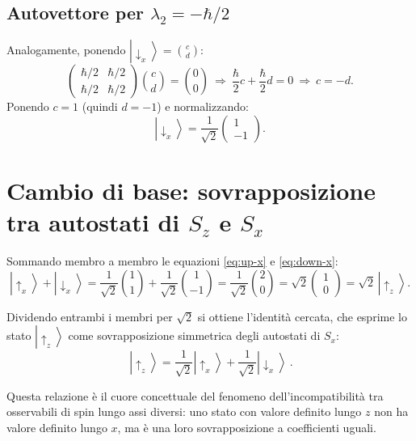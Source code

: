 \documentclass[11pt,a4paper]{article}
\newcommand{\ket}[1]{\left|#1\right\rangle}
\begin{document}
\subsection{Autovettore per \texorpdfstring{$\lambda_2=-\hbar/2$}{lambda2=-h/2}}

Analogamente, ponendo $\ket{\downarrow_x}=\binom{c}{d}$:
\[
\begin{pmatrix}\hbar/2 & \hbar/2\\ \hbar/2 & \hbar/2\end{pmatrix}\binom{c}{d}=\binom{0}{0}
\ \Longrightarrow\ \frac{\hbar}{2}c+\frac{\hbar}{2}d=0 \ \Longrightarrow\ c=-d.
\]
Ponendo $c=1$ (quindi $d=-1$) e normalizzando:
\begin{equation}
\ket{\downarrow_x} = \frac{1}{\sqrt2}\begin{pmatrix}1\\-1\end{pmatrix}.
\label{eq:down-x}
\end{equation}

\section{Cambio di base: sovrapposizione tra autostati di \texorpdfstring{$S_z$}{Sz} e \texorpdfstring{$S_x$}{Sx}}

Sommando membro a membro le equazioni \eqref{eq:up-x} e \eqref{eq:down-x}:
\begin{equation}
\ket{\uparrow_x}+\ket{\downarrow_x}
= \frac{1}{\sqrt2}\binom{1}{1}+\frac{1}{\sqrt2}\binom{1}{-1}
= \frac{1}{\sqrt2}\binom{2}{0}
= \sqrt2\begin{pmatrix}1\\0\end{pmatrix}
= \sqrt2\,\ket{\uparrow_z}.
\label{eq:somma-autostati}
\end{equation}

Dividendo entrambi i membri per $\sqrt2$ si ottiene l'identità cercata, che esprime lo stato $\ket{\uparrow_z}$ come sovrapposizione simmetrica degli autostati di $S_x$:
\begin{equation}
\boxed{\ \ket{\uparrow_z} = \frac{1}{\sqrt2}\ket{\uparrow_x}+\frac{1}{\sqrt2}\ket{\downarrow_x}\ }.
\label{eq:identita-cambio-base}
\end{equation}

Questa relazione è il cuore concettuale del fenomeno dell'incompatibilità tra osservabili di spin lungo assi diversi: uno stato con valore definito lungo $z$ non ha valore definito lungo $x$, ma è una loro sovrapposizione a coefficienti uguali.
\end{document}
